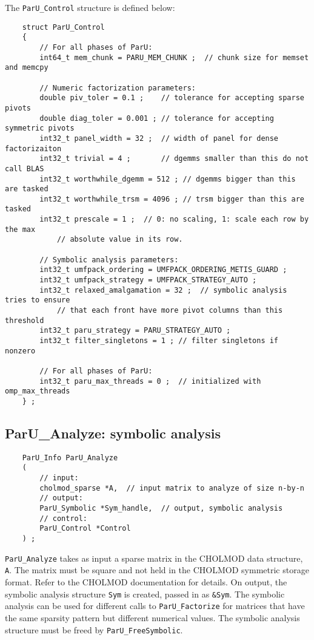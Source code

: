\documentclass[12pt]{article}
\begin{document}
    The \verb'ParU_Control' structure is defined below:

    {\footnotesize
    \begin{verbatim}
    struct ParU_Control
    {
        // For all phases of ParU:
        int64_t mem_chunk = PARU_MEM_CHUNK ;  // chunk size for memset and memcpy

        // Numeric factorization parameters:
        double piv_toler = 0.1 ;    // tolerance for accepting sparse pivots
        double diag_toler = 0.001 ; // tolerance for accepting symmetric pivots
        int32_t panel_width = 32 ;  // width of panel for dense factorizaiton
        int32_t trivial = 4 ;       // dgemms smaller than this do not call BLAS
        int32_t worthwhile_dgemm = 512 ; // dgemms bigger than this are tasked
        int32_t worthwhile_trsm = 4096 ; // trsm bigger than this are tasked
        int32_t prescale = 1 ;  // 0: no scaling, 1: scale each row by the max
            // absolute value in its row.

        // Symbolic analysis parameters:
        int32_t umfpack_ordering = UMFPACK_ORDERING_METIS_GUARD ;
        int32_t umfpack_strategy = UMFPACK_STRATEGY_AUTO ;
        int32_t relaxed_amalgamation = 32 ;  // symbolic analysis tries to ensure
            // that each front have more pivot columns than this threshold
        int32_t paru_strategy = PARU_STRATEGY_AUTO ;
        int32_t filter_singletons = 1 ; // filter singletons if nonzero

        // For all phases of ParU:
        int32_t paru_max_threads = 0 ;  // initialized with omp_max_threads
    } ; \end{verbatim}}

\subsection{{\sf ParU\_Analyze}: symbolic analysis}

    {\footnotesize
    \begin{verbatim}
    ParU_Info ParU_Analyze
    (
        // input:
        cholmod_sparse *A,  // input matrix to analyze of size n-by-n
        // output:
        ParU_Symbolic *Sym_handle,  // output, symbolic analysis
        // control:
        ParU_Control *Control
    ) ; \end{verbatim}}

    \verb'ParU_Analyze' takes as input a sparse matrix in the CHOLMOD data
    structure, \verb'A'.  The matrix must be square and not held in the CHOLMOD
    symmetric storage format.  Refer to the CHOLMOD documentation for details.
    On output, the symbolic analysis structure \verb'Sym' is created, passed in
    as \verb'&Sym'.  The symbolic analysis can be used for different calls to
    \verb'ParU_Factorize' for matrices that have the same sparsity pattern but
    different numerical values.
    The symbolic analysis structure
    must be freed by \verb'ParU_FreeSymbolic'.
\end{document}
